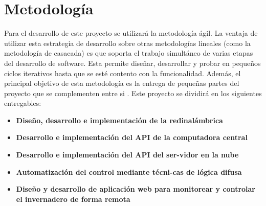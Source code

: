 \section{Metodología}

Para el desarrollo de este proyecto se utilizará la metodología ágil. La ventaja de utilizar esta estrategia de desarrollo sobre otras metodologías lineales (como la metodología de casacada) es que soporta el trabajo simultáneo de varias etapas del desarrollo de software. Esta permite diseñar, desarrollar y probar en pequeños ciclos iterativos hasta que se esté contento con la funcionalidad. Además, el principal objetivo de esta metodología es la entrega de pequeñas partes del proyecto que se complementen entre si \cite{what_is_agile_meth}. Este proyecto se dividirá en los siguientes entregables:

\begin{itemize}
    \item \textbf{Diseño, desarrollo e implementación de la redinalámbrica}
    
    \item \textbf{Desarrollo e implementación del API de la computadora central}
    \item \textbf{Desarrollo e implementación del API del ser-vidor en la nube}
    \item \textbf{Automatización del control mediante técni-cas de lógica difusa}
    \item \textbf{Diseño y desarrollo de aplicación web para monitorear y controlar el invernadero de forma remota}
\end{itemize}








